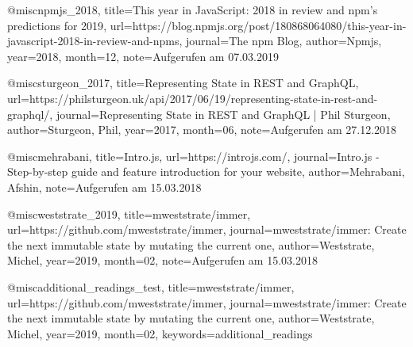 @misc{npmjs_2018, title={This year in JavaScript: 2018 in review and npm's predictions for 2019}, url={https://blog.npmjs.org/post/180868064080/this-year-in-javascript-2018-in-review-and-npms}, journal={The npm Blog}, author={Npmjs}, year={2018}, month={12}, note={Aufgerufen am 07.03.2019}}

@misc{sturgeon_2017, title={Representing State in REST and GraphQL}, url={https://philsturgeon.uk/api/2017/06/19/representing-state-in-rest-and-graphql/}, journal={Representing State in REST and GraphQL | Phil Sturgeon}, author={Sturgeon, Phil}, year={2017}, month={06}, note={Aufgerufen am 27.12.2018}}

@misc{mehrabani, title={Intro.js}, url={https://introjs.com/}, journal={Intro.js - Step-by-step guide and feature introduction for your website}, author={Mehrabani, Afshin}, note={Aufgerufen am 15.03.2018}}

@misc{weststrate_2019, title={mweststrate/immer}, url={https://github.com/mweststrate/immer}, journal={mweststrate/immer: Create the next immutable state by mutating the current one}, author={Weststrate, Michel}, year={2019}, month={02}, note={Aufgerufen am 15.03.2018}}

@misc{additional_readings_test, title={mweststrate/immer}, url={https://github.com/mweststrate/immer}, journal={mweststrate/immer: Create the next immutable state by mutating the current one}, author={Weststrate, Michel}, year={2019}, month={02}, keywords={additional_readings}}